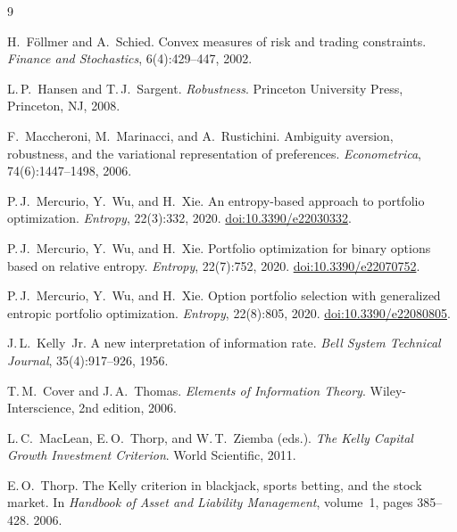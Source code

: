 \documentclass[11pt]{article}
\providecommand{\doi}[1]{\href{https://doi.org/#1}{doi:#1}}
\begin{document}

\begin{thebibliography}{9}

H.~F\"ollmer and A.~Schied.
\newblock Convex measures of risk and trading constraints.
\newblock \emph{Finance and Stochastics}, 6(4):429--447, 2002.

L.\,P.~Hansen and T.\,J.~Sargent.
\newblock \emph{Robustness}.
\newblock Princeton University Press, Princeton, NJ, 2008.

F.~Maccheroni, M.~Marinacci, and A.~Rustichini.
\newblock Ambiguity aversion, robustness, and the variational representation of preferences.
\newblock \emph{Econometrica}, 74(6):1447--1498, 2006.

P.\,J.~Mercurio, Y.~Wu, and H.~Xie.
\newblock An entropy-based approach to portfolio optimization.
\newblock \emph{Entropy}, 22(3):332, 2020.
\newblock \doi{10.3390/e22030332}.

P.\,J.~Mercurio, Y.~Wu, and H.~Xie.
\newblock Portfolio optimization for binary options based on relative entropy.
\newblock \emph{Entropy}, 22(7):752, 2020.
\newblock \doi{10.3390/e22070752}.

P.\,J.~Mercurio, Y.~Wu, and H.~Xie.
\newblock Option portfolio selection with generalized entropic portfolio optimization.
\newblock \emph{Entropy}, 22(8):805, 2020.
\newblock \doi{10.3390/e22080805}.

J.\,L.~Kelly~Jr.
\newblock A new interpretation of information rate.
\newblock \emph{Bell System Technical Journal}, 35(4):917--926, 1956.

T.\,M.~Cover and J.\,A.~Thomas.
\newblock \emph{Elements of Information Theory}.
\newblock Wiley-Interscience, 2nd edition, 2006.

L.\,C.~MacLean, E.\,O.~Thorp, and W.\,T.~Ziemba (eds.).
\newblock \emph{The Kelly Capital Growth Investment Criterion}.
\newblock World Scientific, 2011.

E.\,O.~Thorp.
\newblock The Kelly criterion in blackjack, sports betting, and the stock market.
\newblock In \emph{Handbook of Asset and Liability Management}, volume~1,
pages 385--428. 2006.


\end{thebibliography}
\end{document}

